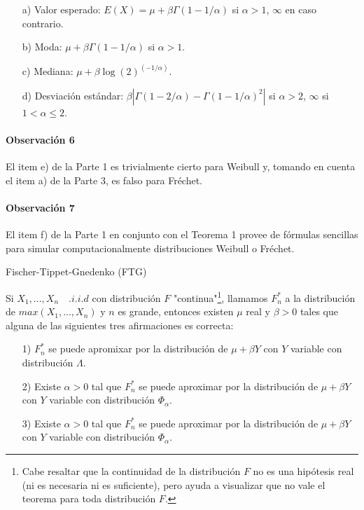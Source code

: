 \documentclass[
  12pt]{article}
\begin{document}
\begin{theorem}
\begin{itemize}
\begin{itemize}
  \item[a)] Valor esperado: $E(X) = \mu + \beta\Gamma(1-1/\alpha)$ si $\alpha > 1$, $\infty$ en caso contrario.
  \item[b)] Moda: $\mu + \beta\Gamma(1-1/\alpha)$ si $\alpha>1$.
  \item[c)] Mediana: $\mu + \beta \log(2)^{(-1/\alpha)}$.
  \item[d)] Desviación estándar: $\beta|\Gamma(1-2/\alpha)-\Gamma(1-1/\alpha)^2|$ si $\alpha>2$, $\infty$ si $1<\alpha \leq 2$.
\end{itemize}
\end{itemize}
\end{theorem}

\paragraph*{Observación 6}

El item e) de la Parte 1 es trivialmente cierto para Weibull y, tomando
en cuenta el item a) de la Parte 3, es falso para Fréchet.

\paragraph*{Observación 7}

El item f) de la Parte 1 en conjunto con el Teorema 1 provee de fórmulas
sencillas para simular computacionalmente distribuciones Weibull o
Fréchet.

\begin{theorem} Fischer-Tippet-Gnedenko (FTG)

Si $X_1,...,X_n\quad .i.i.d$ con distribución $F$ "continua"\footnote{Cabe resaltar que la continuidad de la distribución $F$ no es una hipótesis real (ni es necesaria ni es suficiente), pero ayuda a visualizar que no vale el teorema para toda distribución $F$.}, llamamos $F_n^*$ a la distribución de $max(X_1,...,X_n)$ y $n$ es grande, entonces existen $\mu$ real y $\beta>0$ tales que alguna de las siguientes tres afirmaciones es correcta:

\begin{itemize}
  \item[1)] $F_n^*$ se puede apromixar por la distribución de $\mu+\beta Y$ con $Y$ variable con distribución $\Lambda$.
  \item[2)] Existe $\alpha>0$ tal que $F_n^*$ se puede aproximar por la distribución de $\mu+\beta Y$ con $Y$ variable con distribución $\Phi_{\alpha}$. 
  \item[3)] Existe $\alpha>0$ tal que $F_n^*$ se puede aproximar por la distribución de $\mu+\beta Y$ con $Y$ variable con distribución $\Phi_{\alpha}$.
\end{itemize}
\end{theorem}
\end{document}

